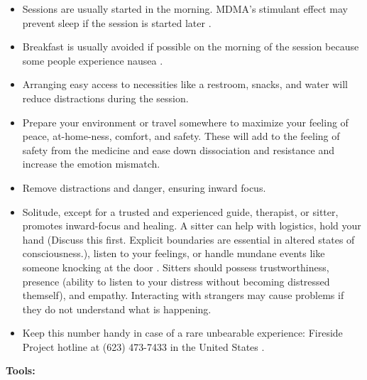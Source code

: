 \documentclass[12pt,letterpaper]{article}
\begin{document}
\begin{itemize}
    \item Sessions are usually started in the morning. MDMA's stimulant effect may prevent sleep if the session is started later \cite{mithoeferManual}.
    \item Breakfast is usually avoided if possible on the morning of the session because some people experience nausea \cite{mithoeferManual}.
    \item Arranging easy access to necessities like a restroom, snacks, and water will reduce distractions during the session.
    \item Prepare your environment or travel somewhere to maximize your feeling of peace, at-home-ness, comfort, and safety. These will add to the feeling of safety from the medicine and ease down dissociation and resistance and increase the emotion mismatch. 
    \item Remove distractions and danger, ensuring inward focus. 
    \item Solitude, except for a trusted and experienced guide, therapist, or sitter, promotes inward-focus and healing. A sitter can help with logistics, hold your hand (Discuss this first. Explicit boundaries are essential in altered states of consciousness.), listen to your feelings, or handle mundane events like someone knocking at the door \cite{mithoeferManual,thalSitter}. Sitters should possess trustworthiness, presence (ability to listen to your distress without becoming distressed themself), and empathy. Interacting with strangers may cause problems if they do not understand what is happening.
    \item Keep this number handy in case of a rare unbearable experience: Fireside Project hotline at (623) 473-7433 in the United States \cite{firesideProject}. 
\end{itemize}
\noindent \textbf{Tools:}
\end{document}
